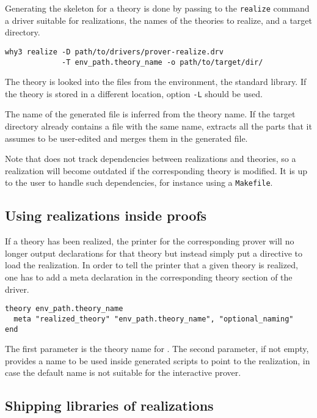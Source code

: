 Generating the skeleton for a theory is done by passing to the
\texttt{realize} command a driver suitable for realizations, the names of
the theories to realize, and a target directory.

\begin{verbatim}
why3 realize -D path/to/drivers/prover-realize.drv
             -T env_path.theory_name -o path/to/target/dir/
\end{verbatim}

The theory is looked into the files from the environment, \eg the standard
library. If the theory is stored in a different location, option \texttt{-L}
should be used.

The name of the generated file is inferred from the theory name. If the
target directory already contains a file with the same name, \why
extracts all the parts that it assumes to be user-edited and merges them in
the generated file.

Note that \why does not track dependencies between realizations and
theories, so a realization will become outdated if the corresponding
theory is modified.
It is up to the user to handle such dependencies, for instance using a
\texttt{Makefile}.

\subsection{Using realizations inside proofs}

If a theory has been realized, the \why printer for the corresponding prover
will no longer output declarations for that theory but instead simply put
a directive to load the realization. In order to tell the printer
that a given theory is realized, one has to add a meta declaration in the
corresponding theory section of the driver.

\begin{verbatim}
theory env_path.theory_name
  meta "realized_theory" "env_path.theory_name", "optional_naming"
end
\end{verbatim}

The first parameter is the theory name for \why. The second
parameter, if not empty, provides a name to be used inside generated
scripts to point to the realization, in case the default name is not
suitable for the interactive prover.

\subsection{Shipping libraries of realizations}

